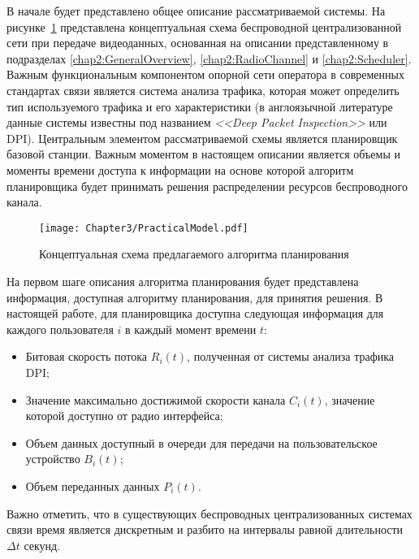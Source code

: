 В начале будет представлено общее описание рассматриваемой системы. На рисунке~\ref{fig:PracticalModel} представлена концептуальная схема беспроводной централизованной сети при передаче видеоданных, основанная на описании представленному в подразделах \ref{chap2:GeneralOverview}, \ref{chap2:RadioChannel} и \ref{chap2:Scheduler}. Важным функциональным компонентом опорной сети оператора в современных стандартах связи является система анализа трафика, которая может определить тип используемого трафика и его характеристики (в англоязычной литературе данные системы известны под названием \textit{<<Deep Packet Inspection>>} или DPI). Центральным элементом рассматриваемой схемы является планировщик базовой станции. Важным моментом в настоящем описании является объемы и моменты времени доступа к информации на основе которой алгоритм планировщика будет принимать решения распределении ресурсов беспроводного канала.

\begin{figure}[htbp]
\begin{center}
\texttt{[image: Chapter3/PracticalModel.pdf]}
\caption{Концептуальная схема предлагаемого алгоритма планирования}
\label{fig:PracticalModel}
\end{center}
\end{figure}

На первом шаге описания алгоритма планирования будет представлена информация, доступная алгоритму планирования, для принятия решения. В настоящей работе, для планировщика доступна следующая информация для каждого пользователя $i$ в каждый момент времени $t$:
\begin{itemize}
	\item Битовая скорость потока $R_i(t)$, полученная от системы анализа трафика DPI;
	\item Значение максимально достижимой скорости канала $C_i(t)$, значение которой доступно от радио интерфейса;
	\item Объем данных доступный в очереди для передачи на пользовательское устройство $B_i(t)$;
	\item Объем переданных данных $P_i(t)$.
\end{itemize}
Важно отметить, что в существующих беспроводных централизованных системах связи время является дискретным и разбито на интервалы равной длительности $\Delta t$ секунд.

